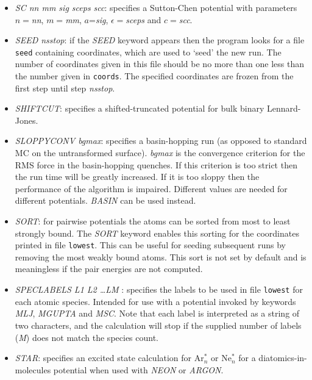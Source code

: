\documentclass[12pt,a4paper,dvips]{article}
\begin{document}
\begin{itemize}
\item {\it SC nn mm sig sceps scc\/}: specifies a Sutton-Chen potential\cite{suttonc90} with
parameters $n=${\it nn\/}, $m=${\it mm\/}, $a$={\it sig\/}, $\epsilon=${\it sceps\/} and 
$c=${\it scc\/}.

\item {\it SEED nsstop\/}: if the {\it SEED\/} keyword appears then the program
looks for a file {\tt seed} containing coordinates, which are used to `seed' the new run.
The number of coordinates given in this file should be no more than one less than the number
given in {\tt coords}. The specified coordinates are frozen from the first step until 
step {\it nsstop\/}.

\item {\it SHIFTCUT\/}: specifies a shifted-truncated potential for bulk binary Lennard-Jones.


\item {\it SLOPPYCONV bgmax\/}: specifies a basin-hopping run (as opposed to standard MC
on the untransformed surface). {\it bgmax\/} is the convergence criterion
for the RMS force in the basin-hopping
quenches. If this criterion is too strict then the run time will be greatly increased.
If it is too sloppy then the performance of the algorithm is impaired. Different values
are needed for different potentials. {\it BASIN} can be used instead.

\item {\it SORT}: for pairwise potentials the atoms can be sorted from most to least
strongly bound. The {\it SORT} keyword enables this sorting for the coordinates printed
in file {\tt lowest}. This can be useful for seeding subsequent runs by removing the
most weakly bound atoms. This sort is not set by default and is meaningless if the
pair energies are not computed.

\item {\it SPECLABELS L1 L2 \dots LM \/}: specifies the labels to be used in file {\tt lowest} for each atomic species. Intended for use with a potential invoked by keywords {\it MLJ\/}, {\it MGUPTA\/} and {\it MSC\/}. Note that each label is interpreted as a string of two characters, and the calculation will stop if the supplied number of labels ({\it M}) does not match the species count.

\item {\it STAR}: specifies an excited state calculation for Ar$^*_n$ or Ne$^*_n$ for
a diatomics-in-molecules potential when used with {\it NEON\/} or {\it ARGON\/}.


\end{itemize}
\end{document}
